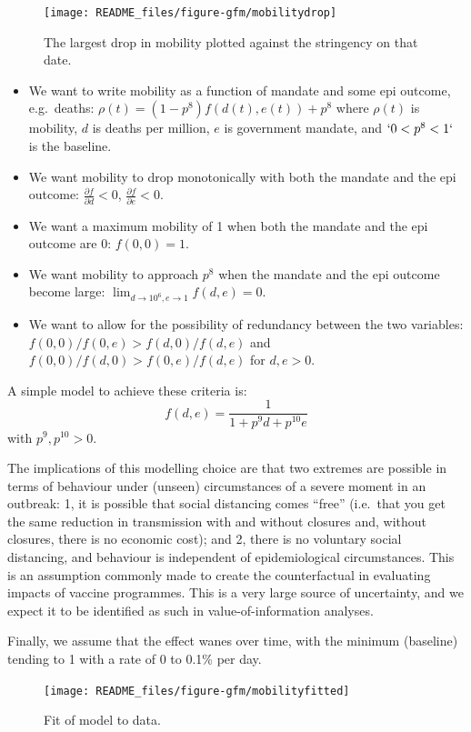 \documentclass[
]{article}
\providecommand{\tightlist}{%
  \setlength{\itemsep}{0pt}\setlength{\parskip}{0pt}}
\begin{document}
\begin{figure}
\texttt{[image: README\_files/figure-gfm/mobilitydrop]} \caption{The largest drop in mobility plotted against the stringency on that date.}\label{fig:mobilitydrop}
\end{figure}

\begin{itemize}
\tightlist
\item
  We want to write mobility as a function of mandate and some epi outcome, e.g.~deaths: \(\rho(t) = (1-p^8)f(d(t),e(t)) + p^8\) where \(\rho(t)\) is mobility, \(d\) is deaths per million, \(e\) is government mandate, and \(`0 < p^8 < 1`\) is the baseline.
\item
  We want mobility to drop monotonically with both the mandate and the epi outcome: \(\frac{\partial f}{\partial d}<0\), \(\frac{\partial f}{\partial e}<0\).
\item
  We want a maximum mobility of 1 when both the mandate and the epi outcome are 0: \(f(0,0)=1\).
\item
  We want mobility to approach \(p^8\) when the mandate and the epi outcome become large: \(\lim_{d\to 10^6, e\to 1}f(d,e)= 0\).
\item
  We want to allow for the possibility of redundancy between the two variables: \(f(0,0)/f(0,e) > f(d,0)/f(d,e)\) and \(f(0,0)/f(d,0) > f(0,e)/f(d,e)\) for \(d,e>0\).
\end{itemize}

A simple model to achieve these criteria is: \[f(d,e) = \frac{1}{1+p^9d+p^{10}e}\]
with \(p^9, p^{10}>0\).

The implications of this modelling choice are that two extremes are possible in terms of behaviour under (unseen) circumstances of a severe moment in an outbreak: 1, it is possible that social distancing comes ``free'' (i.e.~that you get the same reduction in transmission with and without closures and, without closures, there is no economic cost); and 2, there is no voluntary social distancing, and behaviour is independent of epidemiological circumstances. This is an assumption commonly made to create the counterfactual in evaluating impacts of vaccine programmes. This is a very large source of uncertainty, and we expect it to be identified as such in value-of-information analyses.

Finally, we assume that the effect wanes over time, with the minimum (baseline) tending to 1 with a rate of 0 to 0.1\% per day.

\begin{figure}
\texttt{[image: README\_files/figure-gfm/mobilityfitted]} \caption{Fit of model to data.}\label{fig:mobilityfitted}
\end{figure}
\end{document}
